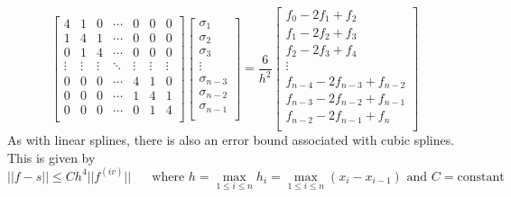 \documentclass[11pt]{article}
\theoremstyle{definition}
\begin{document}
$$\begin{bmatrix}
	4 & 1 & 0 & \cdots & 0 & 0 & 0\\ 
	1 & 4 & 1 & \cdots & 0 & 0 & 0\\ 
	0 & 1 & 4 & \cdots & 0 & 0 & 0\\ 
	\vdots & \vdots & \vdots & \ddots & \vdots & \vdots & \vdots\\ 
	0 & 0 & 0 & \cdots & 4 & 1 & 0\\ 
	0 & 0 & 0 & \cdots & 1 & 4 & 1\\ 
	0 & 0 & 0 & \cdots & 0 & 1 & 4\\ 
\end{bmatrix}
\begin{bmatrix}
	\sigma_1\\
	\sigma_2\\
	\sigma_3\\
	\vdots\\
	\sigma_{n-3}\\
	\sigma_{n-2}\\
	\sigma_{n-1}\\
\end{bmatrix}=\frac{6}{h^2}\begin{bmatrix}
	f_0 - 2f_1+f_2\\
	f_1 - 2f_2+f_3\\
	f_2 - 2f_3+f_4\\	
	\vdots\\
	f_{n-4}-2f_{n-3}+f_{n-2}\\
	f_{n-3}-2f_{n-2}+f_{n-1}\\
	f_{n-2}-2f_{n-1}+f_{n}\\ 
\end{bmatrix}
$$
As with linear splines, there is also an error bound associated with cubic splines. This is given by
$$||f-s||\leqslant Ch^4||f^{(iv)}||\text{ }\text{ }\text{ where }h=\max_{1\leqslant i\leqslant n}h_i=\max_{1\leqslant i\leqslant n}(x_i-x_{i-1})\text{ and } C=\text{constant}$$
\end{document}
